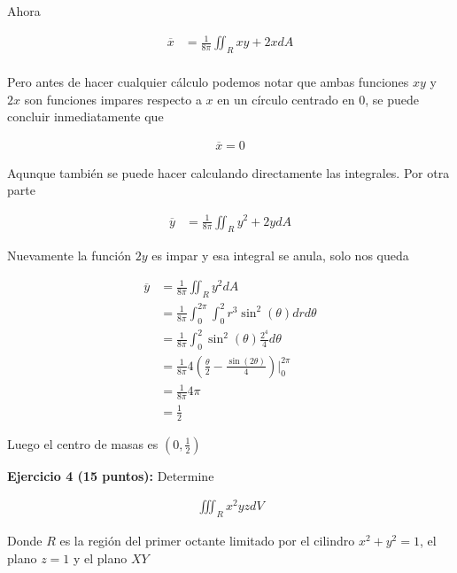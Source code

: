 \documentclass[a4paper]{article}
\begin{document}
Ahora

\begin{align*}
    \overline{x} &= \frac{1}{8\pi} \iint_R xy+2x dA \\
\end{align*}

Pero antes de hacer cualquier cálculo podemos notar que ambas funciones $xy$ y $2x$ son funciones impares respecto a $x$ en un círculo centrado en 0, se puede concluir inmediatamente que

\begin{align*}
    \overline{x} =0
\end{align*}

Aqunque también se puede hacer calculando directamente las integrales. Por otra parte


\begin{align*}
    \overline{y}  &= \frac{1}{8\pi} \iint_R y^2+2y dA
\end{align*}

Nuevamente la función $2y$ es impar y esa integral se anula, solo nos queda


\begin{align*}
    \overline{y}  &= \frac{1}{8\pi} \iint_R y^2dA \\
    &=  \frac{1}{8\pi}\int_0^{2\pi}\int_0^2 r^3\sin^2(\theta) dr d\theta \\
    &=  \frac{1}{8\pi}\int_0^2 \sin^2(\theta) \frac{2^4}{4} d\theta \\
    &= \frac{1}{8\pi} 4\left( \frac{\theta}{2}-\frac{\sin(2\theta)}{4}\right)\bigg|_0^{2\pi} \\
    &=  \frac{1}{8\pi}4\pi \\
    &= \frac{1}{2}
\end{align*}

Luego el centro de masas es $\displaystyle \left( 0 , \frac{1}{2}\right)$






\newpage


\textbf{Ejercicio 4 (15 puntos):} Determine 

\begin{align*}
    \iiint_R x^2yz dV
\end{align*}

Donde $R$ es la región del primer octante limitado por el cilindro $x^2+y^2=1$, el plano $z=1$ y el plano $XY$
\end{document}
